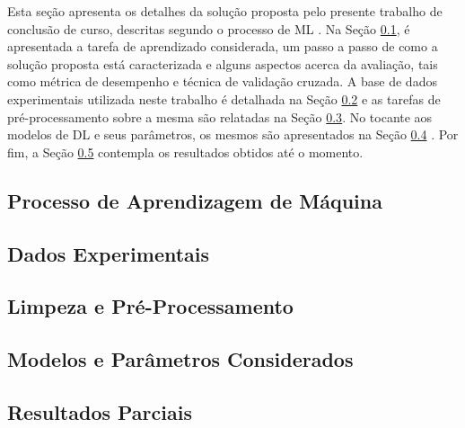 Esta seção apresenta os detalhes da solução proposta pelo presente trabalho de conclusão de curso, descritas segundo o processo de ML \cite[vide Seção 1.5]{ref:marsland}. Na Seção  \ref{subsec:tarefa}, é apresentada a tarefa de aprendizado considerada, um passo a passo de como a solução proposta está caracterizada e alguns aspectos acerca da avaliação, tais como métrica de desempenho e técnica de validação cruzada. A base de dados experimentais utilizada neste trabalho é detalhada na Seção \ref{subsec:dados} e as tarefas de pré-processamento sobre a mesma são relatadas na Seção \ref{subsec:pre-process}. No tocante aos modelos de DL e seus parâmetros, os mesmos são apresentados na Seção \ref{subsec:modelos} . Por fim, a Seção \ref{subsec:resultados} contempla os resultados obtidos até o momento.

\subsection{Processo de Aprendizagem de Máquina} \label{subsec:tarefa}


\subsection{Dados Experimentais} \label{subsec:dados}


\subsection{Limpeza e Pré-Processamento} \label{subsec:pre-process}


\subsection{Modelos e Parâmetros Considerados} \label{subsec:modelos}


\subsection{Resultados Parciais}
\label{subsec:resultados}


%
